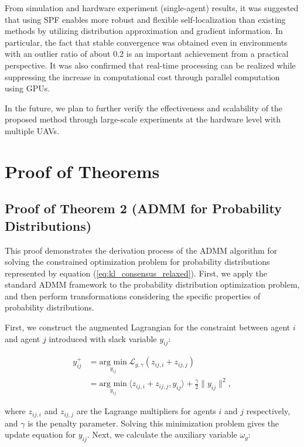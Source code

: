 \documentclass[a4paper,fleqn,10pt,twocolumn]{SICE_ISCS}
\begin{document}
From simulation and hardware experiment (single-agent) results, it was suggested that using SPF enables more robust and flexible self-localization than existing methods by utilizing distribution approximation and gradient information.
In particular, the fact that stable convergence was obtained even in environments with an outlier ratio of about 0.2 is an important achievement from a practical perspective. It was also confirmed that real-time processing can be realized while suppressing the increase in computational cost through parallel computation using GPUs.

In the future, we plan to further verify the effectiveness and scalability of the proposed method through large-scale experiments at the hardware level with multiple UAVs.

\appendix
\section{Proof of Theorems}

\subsection{Proof of Theorem 2 (ADMM for Probability Distributions)}
This proof demonstrates the derivation process of the ADMM algorithm for solving the constrained optimization problem for probability distributions represented by equation (\ref{eq:kl_consensus_relaxed}). First, we apply the standard ADMM framework to the probability distribution optimization problem, and then perform transformations considering the specific properties of probability distributions.

First, we construct the augmented Lagrangian for the constraint between agent $i$ and agent $j$ introduced with slack variable $y_{ij}$:

\begin{equation}
\begin{aligned}
y^+_{ij}&= \underset{y_{ij}}{\text{arg min}}\: {\mathcal{L}}_{g,\gamma}(z_{ij,i} + z_{ij,j})\\
&=  \underset{y_{ij}}{\text{arg min}}\: \langle z_{ij,i} + z_{ij,j}, y_{ij} \rangle +  \frac \gamma 2\|y_{ij}\|^2 ,
\end{aligned}
\end{equation}

where $z_{ij,i}$ and $z_{ij,j}$ are the Lagrange multipliers for agents $i$ and $j$ respectively, and $\gamma$ is the penalty parameter. Solving this minimization problem gives the update equation for $y_{ij}$. Next, we calculate the auxiliary variable $\omega_g$:
\end{document}
